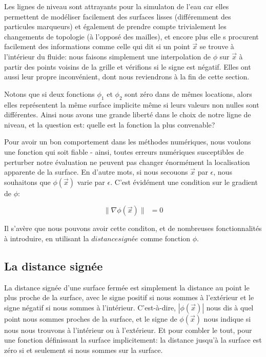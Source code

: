 \documentclass[11pt]{report}
\begin{document}
Les lignes de niveau sont attrayants pour la simulaton de l'eau car elles permettent de modéliser facilement des surfaces lisses (différemment des particules marqueurs) et également de prendre compte trivialement les changements de topologie (à l'opposé des mailles), et encore plus elle s procurent facilement des informations comme celle qui dit si un point $\overrightarrow{x}$ se trouve à l'intérieur du fluide: nous faisons simplement une interpolation de $\phi$ sur $\overrightarrow{x}$ à partir des points voisins de la grille et vérifions si le signe est négatif. Elles ont aussi leur propre inconvénient, dont nous reviendrons à la fin de cette section.\newline

Notons que si deux fonctions $\phi_1$ et $\phi_2$ sont zéro dans de mêmes locations, alors elles représentent la même surface implicite même si leurs valeurs non nulles sont différentes. Ainsi nous avons une grande liberté dans le choix de notre ligne de niveau, et la question est: quelle est la fonction la plus convenable?\newline

Pour avoir un bon comportement dans les méthodes numériques, nous voulons une fonction qui soit fiable - ainsi, toutes erreurs numériques susceptibles de perturber notre évaluation ne peuvent pas changer énormément la localisation apparente de la surface. En d'autre mots, si nous secouons $\overrightarrow{x}$ par $\epsilon$, nous souhaitons que $\phi(\overrightarrow{x})$ varie par $\epsilon$. C'est évidément une condition sur le gradient de $\phi$:

\begin{equation}
\| \nabla \phi (\overrightarrow{x}) \| \,\,\, = 0
\end{equation}

Il s'avère que nous pouvons avoir cette conditon, et de nombreuses fonctionnalités à introduire, en utilisant la $distance signée$ comme fonction $\phi$.

\subsection{La distance signée}

La distance signée d'une surface fermée est simplement la distance au point le plus proche de la surface, avec le signe positif si nous sommes à l'extérieur et le signe négatif si nous sommes à l'intérieur. C'est-à-dire, $|\phi (\overrightarrow{x})|$ nous dis à quel point nous sommes proches de la surface, et le signe de $\phi (\overrightarrow{x})$ nous indique si nous nous trouvons à l'intérieur ou à l'extérieur. Et pour combler le tout, pour une fonction définissant la surface implicitement: la distance jusqu'à la surface est zéro si et seulement si nous sommes sur la surface.\newline
\end{document}
